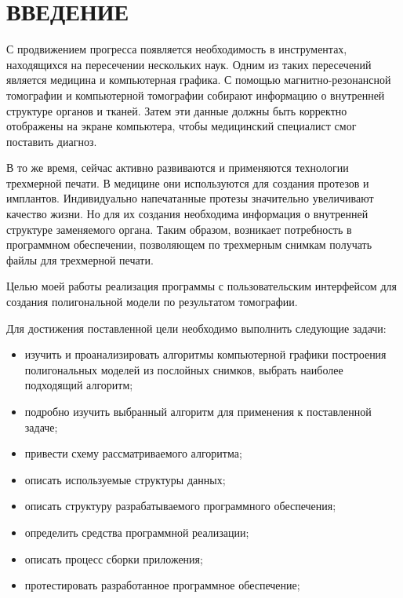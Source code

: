 \chapter*{ВВЕДЕНИЕ}

С продвижением прогресса появляется необходимость в инструментах, находящихся на пересечении нескольких наук. Одним из таких пересечений является медицина и компьютерная графика. С помощью магнитно-резонансной томографии и компьютерной томографии собирают информацию о внутренней структуре органов и тканей. Затем эти данные должны быть корректно отображены на экране компьютера, чтобы медицинский специалист смог поставить диагноз.

В то же время, сейчас активно развиваются и применяются технологии трехмерной печати. В медицине они используются для создания протезов и имплантов. Индивидуально напечатанные протезы значительно увеличивают качество жизни. Но для их создания необходима информация о внутренней структуре заменяемого органа. Таким образом, возникает потребность в программном обеспечении, позволяющем по трехмерным снимкам получать файлы для трехмерной печати.

Целью моей работы реализация программы с пользовательским интерфейсом для создания полигональной модели по результатом томографии.

Для достижения поставленной цели необходимо выполнить следующие задачи: 

\begin{itemize}
    \item изучить и проанализировать алгоритмы компьютерной графики построения полигональных моделей из послойных снимков, выбрать наиболее подходящий алгоритм;
    \item подробно изучить выбранный алгоритм для применения к поставленной задаче;
    \item привести схему рассматриваемого алгоритма;
    \item описать используемые структуры данных;
    \item описать структуру разрабатываемого программного обеспечения;
    \item определить средства программной реализации;
    \item описать процесс сборки приложения;
    \item протестировать разработанное программное обеспечение;
\end{itemize}


